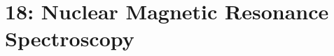 \chapter{18: Nuclear Magnetic Resonance Spectroscopy}\label{18: Nuclear Magnetic Resonance Spectroscopy}